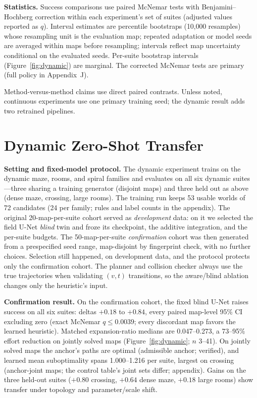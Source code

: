 \documentclass[letterpaper]{article} %
\begin{document}
\textbf{Statistics.}  Success comparisons use paired McNemar tests with Benjamini--Hochberg correction within each experiment's set of suites (adjusted values reported as $q$). Interval estimates are percentile bootstraps (10{,}000 resamples) whose resampling unit is the evaluation map; repeated adaptation or model seeds are averaged within maps before resampling; intervals reflect map uncertainty conditional on the evaluated seeds. Per-suite bootstrap intervals (Figure~\ref{fig:dynamic}) are marginal. The corrected McNemar tests are primary (full policy in Appendix~J).

Method-versus-method claims use direct paired contrasts. Unless noted, continuous experiments use one primary training seed; the dynamic result adds two retrained pipelines.

\section{Dynamic Zero-Shot Transfer}

\textbf{Setting and fixed-model protocol.} The dynamic experiment trains on the dynamic maze, rooms, and spiral families and evaluates on all six dynamic suites---three sharing a training generator (disjoint maps) and three held out as above (dense maze, crossing, large rooms). The training run keeps 53 usable worlds of 72 candidates (24 per family; rules and label counts in the appendix). The original 20-map-per-suite cohort served as \emph{development} data: on it we selected the field U-Net \emph{blind} twin and froze its checkpoint, the additive integration, and the per-suite budgets. The 50-map-per-suite \emph{confirmation} cohort was then generated from a prespecified seed range, map-disjoint by fingerprint check, with no further choices. Selection still happened, on development data, and the protocol protects only the confirmation cohort. The planner and collision checker always use the true trajectories when validating $(v,t)$ transitions, so the aware/blind ablation changes only the heuristic's input.

\textbf{Confirmation result.} On the confirmation cohort, the fixed blind U-Net raises success on all six suites: deltas $+0.18$ to $+0.84$, every paired map-level 95\% CI excluding zero (exact McNemar $q \leq 0.0039$; every discordant map favors the learned heuristic). Matched expansion-ratio medians are 0.047--0.273, a 73--95\% effort reduction on jointly solved maps (Figure~\ref{fig:dynamic}; $n$ 3--41). On jointly solved maps the anchor's paths are optimal (admissible anchor; verified), and learned mean suboptimality spans 1.000--1.216 per suite, largest on crossing (anchor-joint maps; the control table's joint sets differ; appendix). Gains on the three held-out suites ($+0.80$ crossing, $+0.64$ dense maze, $+0.18$ large rooms) show transfer under topology and parameter/scale shift.
\end{document}
